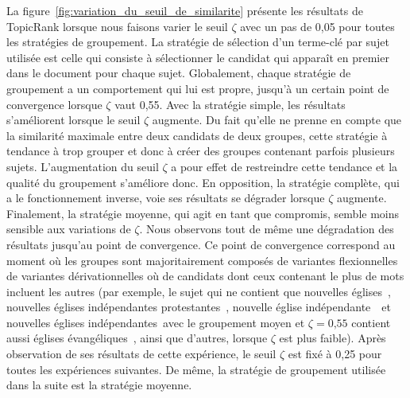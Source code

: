     La figure~\ref{fig:variation_du_seuil_de_similarite} présente les résultats
    de TopicRank lorsque nous faisons varier le seuil $\zeta$ avec un pas de
    0,05 pour toutes les stratégies de groupement. La stratégie de sélection
    d'un terme-clé par sujet utilisée est celle qui consiste à sélectionner le
    candidat qui apparaît en premier dans le document pour chaque sujet.
    Globalement, chaque stratégie de groupement a un comportement qui lui est
    propre, jusqu'à un certain point de convergence lorsque $\zeta$ vaut 0,55.
    Avec la stratégie simple, les résultats s'améliorent lorsque le seuil
    $\zeta$ augmente. Du fait qu'elle ne prenne en compte que la similarité
    maximale entre deux candidats de deux groupes, cette stratégie à tendance à
    trop grouper et donc à créer des groupes contenant parfois plusieurs sujets.
    L'augmentation du seuil $\zeta$ a pour effet de restreindre cette tendance
    et la qualité du groupement s'améliore donc. En opposition, la stratégie
    complète, qui a le fonctionnement inverse, voie ses résultats se dégrader
    lorsque $\zeta$ augmente. Finalement, la stratégie moyenne, qui agit en tant
    que compromis, semble moins sensible aux variations de $\zeta$. Nous
    observons tout de même une dégradation des résultats jusqu'au point de
    convergence. Ce point de convergence correspond au moment où les groupes
    sont majoritairement composés de variantes flexionnelles de variantes
    dérivationnelles où de candidats dont ceux contenant le plus de mots
    incluent les autres (par exemple, le sujet qui ne contient que \og nouvelles
    églises~\fg, \og nouvelles églises indépendantes protestantes~\fg,
    \og nouvelle église indépendante~\fg\ et \og nouvelles églises
    indépendantes~\fg avec le groupement moyen et $\zeta=\text{0,55}$ contient
    aussi \og églises évangéliques~\fg, ainsi que d'autres, lorsque $\zeta$ est
    plus faible).
    Après observation de ses résultats de cette expérience, le seuil $\zeta$ est
    fixé à 0,25 pour toutes les expériences suivantes. De même, la stratégie de
    groupement utilisée dans la suite est la stratégie moyenne.
